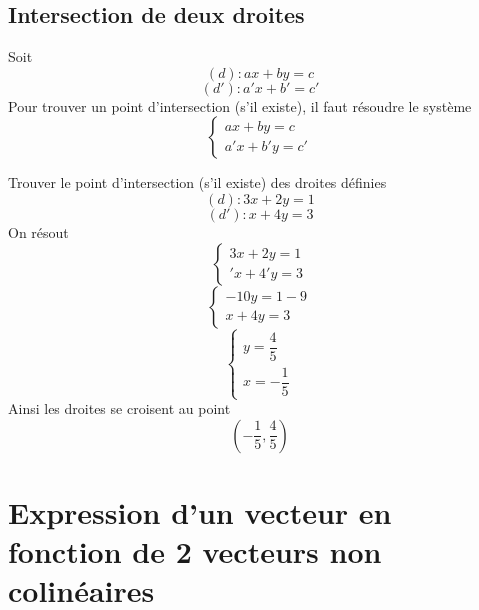 \subsection{Intersection de deux droites}
Soit 
$$(d) : ax+by = c$$
$$(d') : a'x+b' = c'$$
Pour trouver un point d'intersection (s'il existe), il faut résoudre le système 
$$\left\{ \begin{array}{l} ax +by = c \\ a'x+b'y = c' \end{array} \right.$$

\begin{exemple}
Trouver le point d'intersection (s'il existe) des droites définies 
$$(d) : 3x+2y = 1$$
$$(d') : x+4y = 3$$
On résout 
$$\left\{ \begin{array}{l} 3x +2y = 1 \\ 'x+4'y = 3 \end{array} \right.$$
$$\left\{ \begin{array}{l} -10y = 1-9 \\ x+4y = 3 \end{array} \right.$$
$$\left\{ \begin{array}{l} y = \dfrac{4}{5} \\ x = -\dfrac{1}{5} \end{array} \right.$$
Ainsi les droites se croisent au point 
$$\left(-\dfrac{1}{5}, \dfrac{4}{5}\right)$$
\end{exemple}
\section{Expression d'un vecteur en fonction de 2 vecteurs non colinéaires}
\newline


